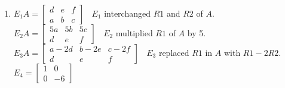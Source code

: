\documentclass{ximera}
\begin{document}
\begin{enumerate}
\setcounter{enumi}{\value{HW}}

\item $E_1A = \left[ \begin{array}{rrr} d & e & f \\ a & b & c\end{array} \right]\;\;$ $E_1$ interchanged $R1$ and $R2$ of $A$.\\
$E_2A = \left[ \begin{array}{rrr} 5a & 5b & 5c \\ d & e & f \end{array} \right]\;\;$ $E_2$ multiplied $R1$ of $A$ by 5.\\
$E_3A = \left[ \begin{array}{rrr} a - 2d & b - 2e & c - 2f \\ d & e & f \end{array} \right]\;\;$ $E_3$ replaced $R1$ in $A$ with $R1 - 2R2$.\\
$E_4 = \left[ \begin{array}{rr} 1 & 0 \\ 0 & -6 \end{array} \right]\;\;$
\end{enumerate}
\end{document}
